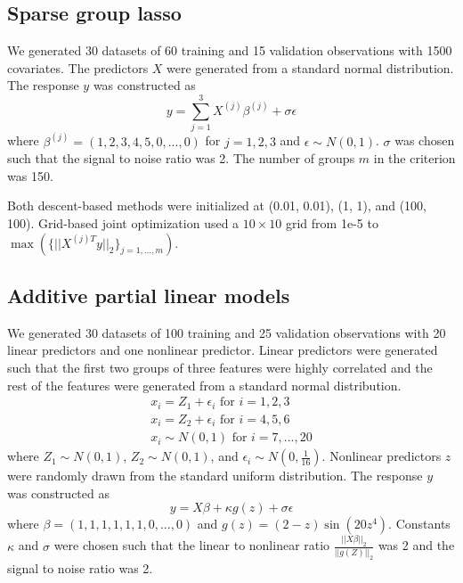 \documentclass[10pt,letterpaper]{article}
\begin{document}
\subsection{Sparse group lasso}

We generated 30 datasets of 60 training and 15 validation observations with 1500 covariates. The predictors $X$ were generated from a standard normal distribution. The response $y$ was constructed as
\begin{equation}
y = \sum\limits_{j=1}^3 X^{(j)} \beta^{(j)} + \sigma \epsilon
\end{equation}
where $\beta^{(j)} = (1, 2, 3, 4, 5, 0, ..., 0)$ for $j = 1, 2, 3$ and $\epsilon \sim N(0, 1)$. $\sigma$ was chosen such that the signal to noise ratio was 2. The number of groups $m$ in the criterion was 150.

Both descent-based methods were initialized at (0.01, 0.01), (1, 1), and (100, 100). Grid-based joint optimization used a $10 \times 10$ grid from 1e-5 to $\max(\{||X^{(j)T}y ||_2\}_{j=1,..., m})$.

\subsection{Additive partial linear models}

We generated 30 datasets of 100 training and 25 validation observations with 20 linear predictors and one nonlinear predictor. Linear predictors were generated such that the first two groups of three features were highly correlated and the rest of the features were generated from a standard normal distribution.
\begin{equation}
\begin{array}{c}
x_i = Z_1 + \epsilon_i \text{ for } i=1, 2, 3 \\
x_i = Z_2 + \epsilon_i \text{ for } i= 4, 5, 6 \\
x_i \sim N(0,1) \text{ for } i = 7, ..., 20
\end{array}
\end{equation}
where $Z_1 \sim N(0,1)$, $Z_2 \sim N(0,1)$, and $\epsilon_i \sim N(0, \frac{1}{16})$. Nonlinear predictors $z$ were randomly drawn from the standard uniform distribution. The response $y$ was constructed as
\begin{equation}
y = X\beta + \kappa g(z) + \sigma \epsilon
\end{equation}
where $\beta = (1, 1, 1, 1, 1, 1, 0, ..., 0)$ and $g(z) =(2-z)\sin(20z^4)$. Constants $\kappa$ and $\sigma$ were chosen such that the linear to nonlinear ratio $\frac{||X\beta||_2}{||g(Z)||_2}$ was 2 and the signal to noise ratio was 2. 
\end{document}
